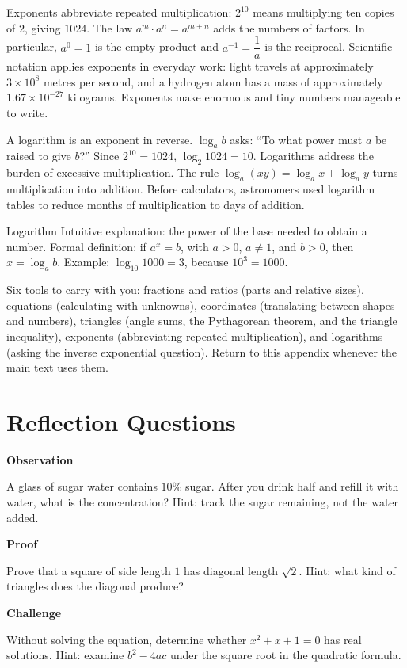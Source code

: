 Exponents abbreviate repeated multiplication: $2^{10}$ means multiplying ten copies of $2$, giving $1024$. The law $a^m\cdot a^n=a^{m+n}$ adds the numbers of factors. In particular, $a^0=1$ is the empty product and $a^{-1}=\dfrac{1}{a}$ is the reciprocal. Scientific notation applies exponents in everyday work: light travels at approximately $3\times10^{8}$ metres per second, and a hydrogen atom has a mass of approximately $1.67\times10^{-27}$ kilograms. Exponents make enormous and tiny numbers manageable to write.

A logarithm is an exponent in reverse. $\log_a b$ asks: ``To what power must $a$ be raised to give $b$?'' Since $2^{10}=1024$, $\log_2 1024=10$. Logarithms address the burden of excessive multiplication. The rule $\log_a(xy)=\log_a x+\log_a y$ turns multiplication into addition. Before calculators, astronomers used logarithm tables to reduce months of multiplication to days of addition.

\begin{shuyu}{Logarithm}
Intuitive explanation: the power of the base needed to obtain a number. Formal definition: if $a^x=b$, with $a>0$, $a\neq1$, and $b>0$, then $x=\log_a b$. Example: $\log_{10}1000=3$, because $10^3=1000$.
\end{shuyu}

\begin{toolbox}
Six tools to carry with you: fractions and ratios (parts and relative sizes), equations (calculating with unknowns), coordinates (translating between shapes and numbers), triangles (angle sums, the Pythagorean theorem, and the triangle inequality), exponents (abbreviating repeated multiplication), and logarithms (asking the inverse exponential question). Return to this appendix whenever the main text uses them.
\end{toolbox}

\section*{Reflection Questions}

\textbf{Observation}
\begin{sikao}
\item A glass of sugar water contains $10\%$ sugar. After you drink half and refill it with water, what is the concentration? Hint: track the sugar remaining, not the water added.
\end{sikao}

\textbf{Proof}
\begin{sikao}
\item Prove that a square of side length $1$ has diagonal length $\sqrt{2}$. Hint: what kind of triangles does the diagonal produce?
\end{sikao}

\textbf{Challenge}
\begin{sikao}
\item Without solving the equation, determine whether $x^2+x+1=0$ has real solutions. Hint: examine $b^2-4ac$ under the square root in the quadratic formula.
\end{sikao}

